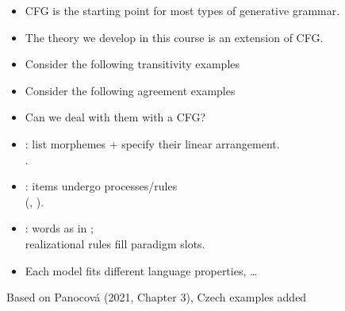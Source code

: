 \documentclass[a4paper,landscape,headrule,footrule]{foils}
\begin{document}

\begin{itemize}
\item CFG is the starting point for most
types of generative grammar.

\item The theory we develop in this course is an
extension of CFG.
\end{itemize}


\begin{itemize}
\item Consider the following transitivity examples
  \begin{exe}
    \ex {}
    \ex {}
    \ex *
    \ex *
  \end{exe}
\item Consider the following agreement examples
  \begin{exe}
    \ex {}
    \ex {}
    \ex *
    \ex *
  \end{exe}
\item Can we deal with them with a CFG?
\end{itemize}



\begin{itemize}
\item {}: list morphemes + specify their linear arrangement.
  \\ . 
\item {}: items undergo processes/rules
  \\ (, ). 
\item {}: words as  in ;
  \\ realizational rules fill paradigm slots. 
\item Each model fits different language properties, \ldots
 \end{itemize}

Based on Panocová (2021, Chapter 3), Czech examples added
\end{document}
